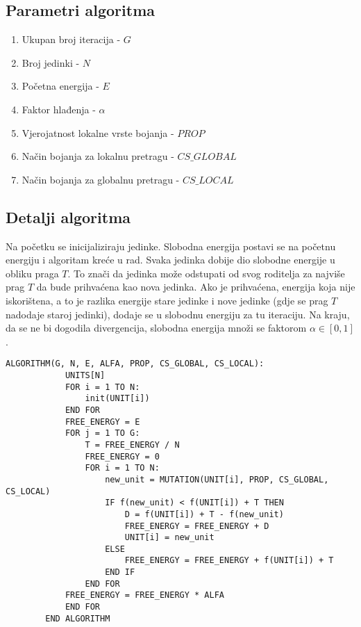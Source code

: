 \documentclass[times, utf8, diplomski, numeric]{fer}
\begin{document}
\subsection{Parametri algoritma}

\begin{enumerate}
	\item Ukupan broj iteracija - $G$
	\item Broj jedinki - $N$
	\item Početna energija - $E$
	\item Faktor hlađenja - $\alpha$
	\item Vjerojatnost lokalne vrste bojanja - $PROP$
	\item Način bojanja za lokalnu pretragu - $CS\_GLOBAL$
	\item Način bojanja za globalnu pretragu - $CS\_LOCAL$
\end{enumerate}


\subsection{Detalji algoritma}

Na početku se inicijaliziraju jedinke. Slobodna energija postavi se na početnu energiju i algoritam kreće u rad. Svaka jedinka dobije dio slobodne energije u obliku praga $T$. To znači da jedinka može odstupati od svog roditelja za najviše prag $T$ da bude prihvaćena kao nova jedinka. Ako je prihvaćena, energija koja nije iskorištena, a to je razlika energije stare jedinke i nove jedinke (gdje se prag $T$ nadodaje staroj jedinki), dodaje se u slobodnu energiju za tu iteraciju. Na kraju, da se ne bi dogodila divergencija, slobodna energija množi se faktorom $\alpha \in [0,1]$.  

\begin{singlespace}
	\begin{lstlisting}[caption=Pseudok\^{o}d genetskog kaljenja]
		ALGORITHM(G, N, E, ALFA, PROP, CS_GLOBAL, CS_LOCAL):
			UNITS[N]
			FOR i = 1 TO N:
				init(UNIT[i])
			END FOR
			FREE_ENERGY = E
			FOR j = 1 TO G:
				T = FREE_ENERGY / N
				FREE_ENERGY = 0
				FOR i = 1 TO N:
					new_unit = MUTATION(UNIT[i], PROP, CS_GLOBAL, CS_LOCAL)
					IF f(new_unit) < f(UNIT[i]) + T THEN
						D = f(UNIT[i]) + T - f(new_unit)
						FREE_ENERGY = FREE_ENERGY + D
						UNIT[i] = new_unit
					ELSE
						FREE_ENERGY = FREE_ENERGY + f(UNIT[i]) + T
					END IF
				END FOR
			FREE_ENERGY = FREE_ENERGY * ALFA
			END FOR
		END ALGORITHM
	\end{lstlisting}
\end{singlespace}
\end{document}
